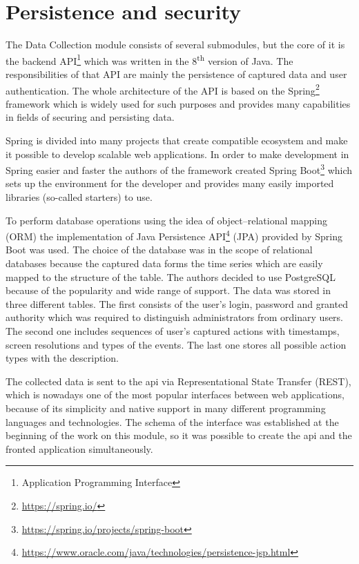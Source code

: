 \section{Persistence and security}\label{sec:persistence-and-security}
The Data Collection module consists of several submodules, but the core of it is the backend API\footnote{Application Programming Interface} which was written in the 8\textsuperscript{th} version of Java.
The responsibilities of that API are mainly the persistence of captured data and user authentication.
The whole architecture of the API is based on the Spring\footnote{\url{https://spring.io/}} framework which is widely used for such purposes and provides many capabilities in fields of securing and persisting data.

Spring is divided into many projects that create compatible ecosystem and make it possible to develop scalable web applications.
In order to make development in Spring easier and faster the authors of the framework created Spring Boot\footnote{\url{https://spring.io/projects/spring-boot}} which sets up the environment for the developer and provides many easily imported libraries (so-called starters) to use.

To perform database operations using the idea of object–relational mapping (ORM) the implementation of Java Persistence API\footnote{\url{https://www.oracle.com/java/technologies/persistence-jsp.html}} (JPA) provided by Spring Boot was used.
The choice of the database was in the scope of relational databases because the captured data forms the time series which are easily mapped to the structure of the table.
The authors decided to use PostgreSQL because of the popularity and wide range of support.
The data was stored in three different tables.
The first consists of the user's login, password and granted authority which was required to distinguish administrators from ordinary users.
The second one includes sequences of user's captured actions with timestamps, screen resolutions and types of the events.
The last one stores all possible action types with the description.

The collected data is sent to the \gls{api} via Representational State Transfer (REST), which is nowadays one of the most popular interfaces between web applications, because of its simplicity and native support in many different programming languages and technologies.
The schema of the interface was established at the beginning of the work on this module, so it was possible to create the \gls{api} and the fronted application simultaneously.

